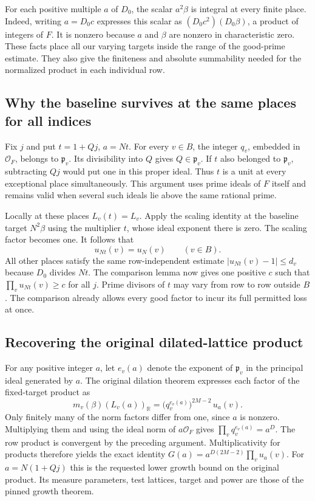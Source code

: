 \documentclass[12pt,letterpaper]{article}
\begin{document}
For each positive multiple $a$ of $D_0$, the scalar $a^2\beta$ is integral at every finite place. Indeed, writing $a=D_0c$ expresses this scalar as $(D_0c^2)(D_0\beta)$, a product of integers of $F$. It is nonzero because $a$ and $\beta$ are nonzero in characteristic zero. These facts place all our varying targets inside the range of the good-prime estimate. They also give the finiteness and absolute summability needed for the normalized product in each individual row.

\subsection{Why the baseline survives at the same places for all indices}

Fix $j$ and put $t=1+Qj$, $a=Nt$. For every $v\in B$, the integer $q_v$, embedded in $\mathcal O_F$, belongs to $\mathfrak p_v$. Its divisibility into $Q$ gives $Q\in\mathfrak p_v$. If $t$ also belonged to $\mathfrak p_v$, subtracting $Qj$ would put one in this proper ideal. Thus $t$ is a unit at every exceptional place simultaneously. This argument uses prime ideals of $F$ itself and remains valid when several such ideals lie above the same rational prime.

Locally at these places $L_v(t)=L_v$. Apply the scaling identity at the baseline target $N^2\beta$ using the multiplier $t$, whose ideal exponent there is zero. The scaling factor becomes one. It follows that
\[
                      u_{Nt}(v)=u_N(v)\qquad(v\in B).
\]
All other places satisfy the same row-independent estimate $|u_{Nt}(v)-1|\leq d_v$ because $D_0$ divides $Nt$. The comparison lemma now gives one positive $c$ such that $\prod_v u_{Nt}(v)\geq c$ for all $j$. Prime divisors of $t$ may vary from row to row outside $B$. The comparison already allows every good factor to incur its full permitted loss at once.

\subsection{Recovering the original dilated-lattice product}

For any positive integer $a$, let $e_v(a)$ denote the exponent of $\mathfrak p_v$ in the principal ideal generated by $a$. The original dilation theorem expresses each factor of the fixed-target product as
\[
 m_v(\beta)(L_v(a))_{\mathbb R}
     =\big(q_v^{e_v(a)}\big)^{2M-2}\,u_a(v).
\]
Only finitely many of the norm factors differ from one, since $a$ is nonzero. Multiplying them and using the ideal norm of $a\mathcal O_F$ gives $\prod_v q_v^{e_v(a)}=a^D$. The row product is convergent by the preceding argument. Multiplicativity for products therefore yields the exact identity $G(a)=a^{D(2M-2)}\prod_v u_a(v)$. For $a=N(1+Qj)$ this is the requested lower growth bound on the original product. Its measure parameters, test lattices, target and power are those of the pinned growth theorem.
\end{document}
